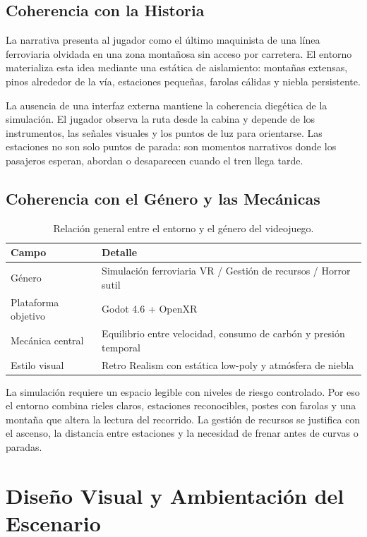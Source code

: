 ﻿\documentclass[11pt,letterpaper]{article}
\begin{document}
\subsection{Coherencia con la Historia}

La narrativa presenta al jugador como el último maquinista de una línea ferroviaria olvidada en una zona montañosa sin acceso por carretera. El entorno materializa esta idea mediante una estática de aislamiento: montañas extensas, pinos alrededor de la vía, estaciones pequeñas, farolas cálidas y niebla persistente.

La ausencia de una interfaz externa mantiene la coherencia diegética de la simulación. El jugador observa la ruta desde la cabina y depende de los instrumentos, las señales visuales y los puntos de luz para orientarse. Las estaciones no son solo puntos de parada: son momentos narrativos donde los pasajeros esperan, abordan o desaparecen cuando el tren llega tarde.

\subsection{Coherencia con el Género y las Mecánicas}

\begin{table}[H]
\centering
\begin{tabularx}{\textwidth}{@{}L{4cm}Y@{}}
\toprule
\textbf{Campo} & \textbf{Detalle}\\
\midrule
Género & Simulación ferroviaria VR / Gestión de recursos / Horror sutil\\
Plataforma objetivo & Godot 4.6 + OpenXR\\
Mecánica central & Equilibrio entre velocidad, consumo de carbón y presión temporal\\
Estilo visual & Retro Realism con estática low-poly y atmósfera de niebla\\
\bottomrule
\end{tabularx}
\caption{Relación general entre el entorno y el género del videojuego.}
\end{table}

La simulación requiere un espacio legible con niveles de riesgo controlado. Por eso el entorno combina rieles claros, estaciones reconocibles, postes con farolas y una montaña que altera la lectura del recorrido. La gestión de recursos se justifica con el ascenso, la distancia entre estaciones y la necesidad de frenar antes de curvas o paradas.

\section{Diseño Visual y Ambientación del Escenario}
\end{document}
